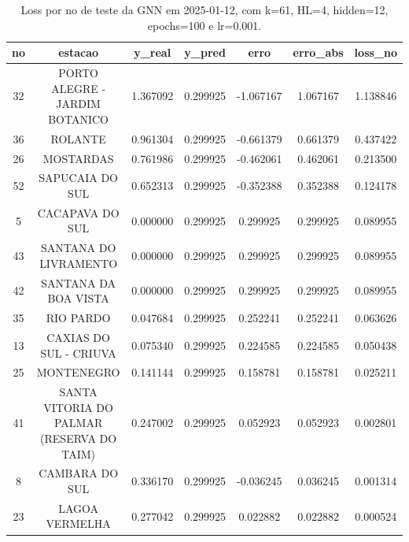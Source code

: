 \begin{table}[h]
\centering
\caption{Loss por no de teste da GNN em 2025-01-12, com k=61, HL=4, hidden=12, epochs=100 e lr=0.001.}
\label{tab:gnn_loss_k61_hl4_h12_e100_d20250112}
\begin{tabular}{ccccccc}
\toprule
no & estacao & y\_real & y\_pred & erro & erro\_abs & loss\_no \\
\midrule
32 & PORTO ALEGRE - JARDIM BOTANICO & 1.367092 & 0.299925 & -1.067167 & 1.067167 & 1.138846 \\
36 & ROLANTE & 0.961304 & 0.299925 & -0.661379 & 0.661379 & 0.437422 \\
26 & MOSTARDAS & 0.761986 & 0.299925 & -0.462061 & 0.462061 & 0.213500 \\
52 & SAPUCAIA DO SUL & 0.652313 & 0.299925 & -0.352388 & 0.352388 & 0.124178 \\
5 & CACAPAVA DO SUL & 0.000000 & 0.299925 & 0.299925 & 0.299925 & 0.089955 \\
43 & SANTANA DO LIVRAMENTO & 0.000000 & 0.299925 & 0.299925 & 0.299925 & 0.089955 \\
42 & SANTANA DA BOA VISTA & 0.000000 & 0.299925 & 0.299925 & 0.299925 & 0.089955 \\
35 & RIO PARDO & 0.047684 & 0.299925 & 0.252241 & 0.252241 & 0.063626 \\
13 & CAXIAS DO SUL - CRIUVA & 0.075340 & 0.299925 & 0.224585 & 0.224585 & 0.050438 \\
25 & MONTENEGRO & 0.141144 & 0.299925 & 0.158781 & 0.158781 & 0.025211 \\
41 & SANTA VITORIA DO PALMAR (RESERVA DO TAIM) & 0.247002 & 0.299925 & 0.052923 & 0.052923 & 0.002801 \\
8 & CAMBARA DO SUL & 0.336170 & 0.299925 & -0.036245 & 0.036245 & 0.001314 \\
23 & LAGOA VERMELHA & 0.277042 & 0.299925 & 0.022882 & 0.022882 & 0.000524 \\
\bottomrule
\end{tabular}
\end{table}
